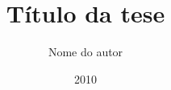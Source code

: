 \documentclass[pt,prepmsc,twoside,12pt]{thesisdifctunl}
\title{Título da tese}
\author{Nome do autor}
\date{2010}
\begin{document}
\frontmatter

\frontpage
\presentationpage
\printdedicatory
\printacknowledgements
\printabstract

\tableofcontents
\printotherlists


\printchapters

\printbibliography

\printappendixes 

\end{document}
